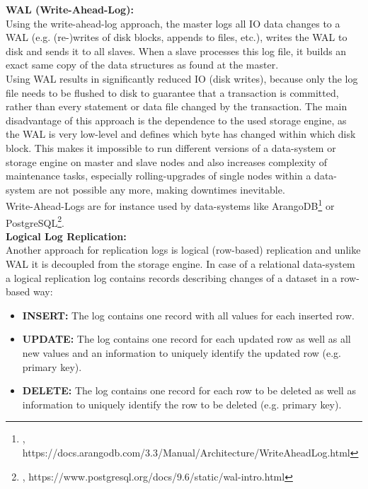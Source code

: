 {\textbf{WAL (Write-Ahead-Log):}\\
Using the write-ahead-log approach, the master logs all IO data changes to a WAL (e.g. (re-)writes of disk blocks, appends to files, etc.), writes the WAL to disk and sends it to all slaves. When a slave processes this log file, it builds an exact same copy of the data structures as found at the master.\\
Using WAL results in significantly reduced IO (disk writes), because only the log file needs to be flushed to disk to guarantee that a transaction is committed, rather than every statement or data file changed by the transaction. The main disadvantage of this approach is the dependence to the used storage engine, as the WAL is very low-level and defines which byte has changed within which disk block. This makes it impossible to run different versions of a data-system or storage engine on master and slave nodes and also increases complexity of maintenance tasks, especially rolling-upgrades of single nodes within a data-system are not possible any more, making downtimes inevitable.\\
Write-Ahead-Logs are for instance used by data-systems like ArangoDB\footnote{\cite{ARANGOWAL}, https://docs.arangodb.com/3.3/Manual/Architecture/WriteAheadLog.html} or PostgreSQL\footnote{\cite{PSQLWAL}, https://www.postgresql.org/docs/9.6/static/wal-intro.html}.\\


\textbf{Logical Log Replication:}\\
Another approach for replication logs is logical (row-based) replication and unlike WAL it is decoupled from the storage engine. In case of a relational data-system a logical replication log contains records describing changes of a dataset in a row-based way:\\
\begin{itemize}
\item \textbf{INSERT:} The log contains one record with all values for each inserted row.
\item \textbf{UPDATE:} The log contains one record for each updated row as well as all new values and an information to uniquely identify the updated row (e.g. primary key).
\item \textbf{DELETE:} The log contains one record for each row to be deleted as well as information to uniquely identify the row to be deleted (e.g. primary key).\\
\end{itemize}

}
